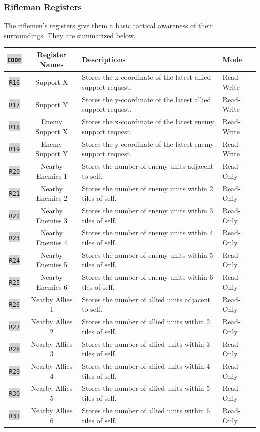 \documentclass{article}
\newcommand{\vnscode}[1]{\colorbox{lightgray}{\lstinline[language=vns]{#1}}}
\begin{document}
\subsubsection{Rifleman Registers}

The riflemen's registers give them a basic tactical awareness of their
surroundings. They are summarized below.

\begin{minipage}{\textwidth}
\centering
\begin{tabular}{|c|c|l|l|}
    \hline \vnscode{CODE} & Register Names & Descriptions & Mode \\ \hline
    \vnscode{R16} & Support X & Stores the x-coordinate of the latest allied support request. & Read-Write \\ \hline
    \vnscode{R17} & Support Y & Stores the y-coordinate of the latest allied support request. & Read-Write \\ \hline
    \vnscode{R18} & Enemy Support X & Stores the x-coordinate of the latest enemy support request. & Read-Write \\ \hline
    \vnscode{R19} & Enemy Support Y & Stores the y-coordinate of the latest enemy support request. & Read-Write \\ \hline
    \vnscode{R20} & Nearby Enemies 1 & Stores the number of enemy units adjacent to self. & Read-Only \\ \hline
    \vnscode{R21} & Nearby Enemies 2 & Stores the number of enemy units within 2 tiles of self. & Read-Only \\ \hline
    \vnscode{R22} & Nearby Enemies 3 & Stores the number of enemy units within 3 tiles of self. & Read-Only \\ \hline
    \vnscode{R23} & Nearby Enemies 4 & Stores the number of enemy units within 4 tiles of self. & Read-Only \\ \hline
    \vnscode{R24} & Nearby Enemies 5 & Stores the number of enemy units within 5 tiles of self. & Read-Only \\ \hline
    \vnscode{R25} & Nearby Enemies 6 & Stores the number of enemy units within 6 tles of self. & Read-Only \\ \hline
    \vnscode{R26} & Nearby Allies 1 & Stores the number of allied units adjacent to self. & Read-Only \\ \hline
    \vnscode{R27} & Nearby Allies 2 & Stores the number of allied units within 2 tiles of self. & Read-Only \\ \hline
    \vnscode{R28} & Nearby Allies 3 & Stores the number of allied units within 3 tiles of self. & Read-Only \\ \hline
    \vnscode{R29} & Nearby Allies 4 & Stores the number of allied units within 4 tiles of self. & Read-Only \\ \hline
    \vnscode{R30} & Nearby Allies 5 & Stores the number of allied units within 5 tiles of self. & Read-Only \\ \hline
    \vnscode{R31} & Nearby Allies 6 & Stores the number of allied units within 6 tiles of self. & Read-Only \\ \hline
\end{tabular}
\end{minipage}
\end{document}

